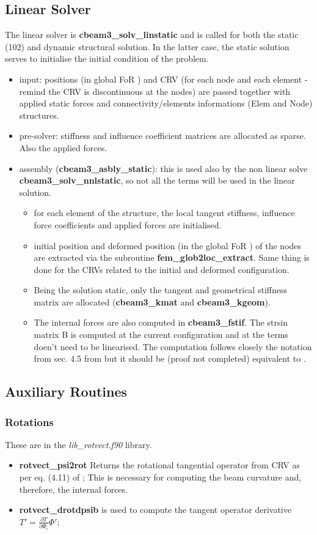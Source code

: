 \documentclass[a4paper,10pt]{article}
\newcommand{\bit}{\begin{itemize}}
\newcommand{\eit}{\end{itemize}}
\newcommand{\pder}[2]{\frac{\partial{#1}}{\partial{#2}}}	%
\newcommand{\ffile}[1]{\textsl{{#1}.f90}} %
\newcommand{\ffun}[1]{\textbf{{#1}}}  %
\newcommand{\for}{FoR }
\begin{document}
\subsection{Linear Solver}
The linear solver is \ffun{cbeam3\_solv\_linstatic} and is called for both the static (102) and dynamic structural solution. In the latter case, the static solution serves to initialise the initial condition of the problem. 
\bit
\item input: positions (in global \for) and CRV (for each node and each element - remind the CRV is discontinuous at the nodes) are passed together with applied static forces and connectivity/elements informations (Elem and Node) structures. 
\item pre-solver: stiffness and influence coefficient matrices are allocated as sparse. Also the applied forces.
\item assembly (\ffun{cbeam3\_asbly\_static}): this is used also by the non linear solve \ffun{cbeam3\_solv\_nnlstatic}, so not all the terms will be used in the linear solution.
    \bit
	\item for each element of the structure, the local tangent stiffness, influence force coefficients and applied forces are initialised.
	\item initial position and deformed position (in the global \for) of the nodes are extracted via the subroutine \ffun{fem\_glob2loc\_extract}. Same thing is done for the CRVs related to the initial and deformed configuration.
	\item Being the solution static, only the tangent and geometrical stiffness matrix are allocated (\ffun{cbeam3\_kmat} and \ffun{cbeam3\_kgeom}). 
	\item The internal forces  are also computed in \ffun{cbeam3\_fstif}. The strsin matrix B is computed at the current configuration and at the terms doen't need to be linearised. The computation follows closely the notation from sec. 4.5 from \cite{Palacios2009} but it should be (proof not completed) equivalent to \cite{Geradin2001}.
	\eit 
\eit


\subsection{Auxiliary Routines}

\subsubsection{Rotations}
These are in the \ffile{lib\_rotvect} library.
\bit
\item \ffun{rotvect\_psi2rot} Returns the rotational tangential operator from CRV as per eq. (4.11) of \cite{Geradin2001}; This is necessary for computing the beam curvature and, therefore, the internal forces.
\item \ffun{rotvect\_drotdpsib} is used to compute the tangent operator derivative $T' = \pder{T}{\Phi_i}{\Phi'}$;
\eit
\end{document}
